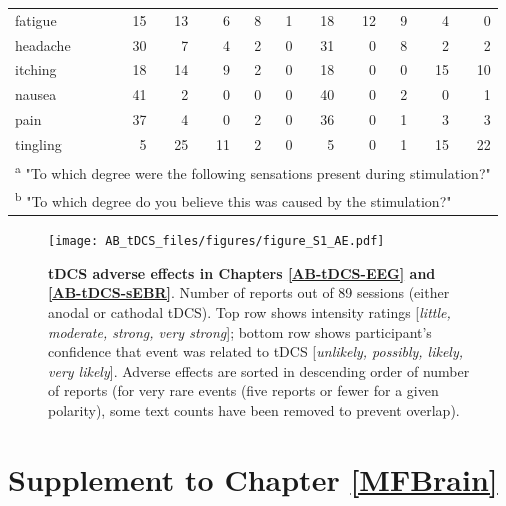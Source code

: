 \documentclass[11pt,english,]{memoir}
\newcommand{\blandscape}{\begin{landscape}}
\newcommand{\elandscape}{\end{landscape}}
\def\defstyle{Ruled} %
\begin{document}
\begin{longtable}{lrrrrrrrrrr}
\hspace{1em}fatigue & 15 & 13 & 6 & 8 & 1 & 18 & 12 & 9 & 4 & 0\\
\hspace{1em}headache & 30 & 7 & 4 & 2 & 0 & 31 & 0 & 8 & 2 & 2\\
\hspace{1em}itching & 18 & 14 & 9 & 2 & 0 & 18 & 0 & 0 & 15 & 10\\
\hspace{1em}nausea & 41 & 2 & 0 & 0 & 0 & 40 & 0 & 2 & 0 & 1\\
\hspace{1em}pain & 37 & 4 & 0 & 2 & 0 & 36 & 0 & 1 & 3 & 3\\
\hspace{1em}tingling & 5 & 25 & 11 & 2 & 0 & 5 & 0 & 1 & 15 & 22\\
\bottomrule
\multicolumn{11}{l}{\textsuperscript{a} "To which degree were the following sensations present during stimulation?"}\\
\multicolumn{11}{l}{\textsuperscript{b} "To which degree do you believe this was caused by the stimulation?"}\\
\end{longtable}
\endgroup{}

\endgroup

\newpage
\pagestyle{empty}
\changetext{}{}{-25mm}{}{}
\blandscape

\begin{figure}
\centering
\texttt{[image: AB\_tDCS\_files/figures/figure\_S1\_AE.pdf]}
\caption{\label{fig:fig-AB-tDCS-AE}\textbf{tDCS adverse effects in Chapters \ref{AB-tDCS-EEG} and \ref{AB-tDCS-sEBR}}. Number of reports out of 89 sessions (either anodal or cathodal tDCS). Top row shows intensity ratings {[}\emph{little, moderate, strong, very strong}{]}; bottom row shows participant's confidence that event was related to tDCS {[}\emph{unlikely, possibly, likely, very likely}{]}. Adverse effects are sorted in descending order of number of reports (for very rare events (five reports or fewer for a given polarity), some text counts have been removed to prevent overlap).}
\end{figure}



\newpage
\elandscape
\changetext{}{}{+25mm}{}{}
\pagestyle{\defstyle}

\hypertarget{MFBrain-supplement}{%
\chapter{Supplement to Chapter \ref{MFBrain}}\label{MFBrain-supplement}}
\end{document}
